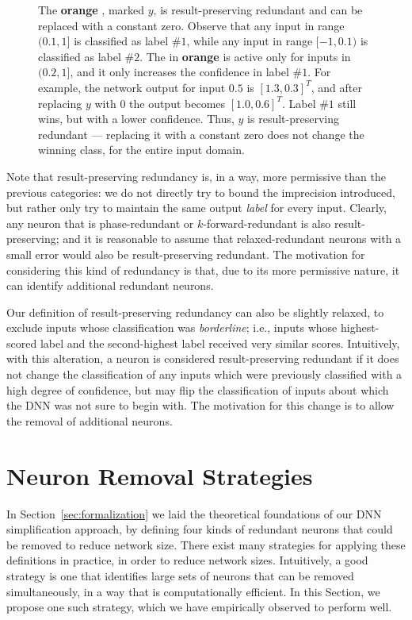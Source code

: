 \documentclass[10pt, conference, twocolumn, compsocconf]{IEEEtran}
\theoremstyle{remark}
\newcommand{\relu}{\text{ReLU}\xspace}
\newcommand{\kfr}{$k$-forward-redundant}
\begin{document}
\begin{figure}[htp]
{
}
\caption {The \textcolor{color1}{\textbf{orange}} \relu{}, marked $y$, is
  result-preserving redundant and can be replaced with a constant zero.
  Observe that any input in range $(0.1, 1]$
  is classified as label $\#1$, while any input in range $[-1, 0.1)$ is
  classified as label $\#2$. The \relu{} in
  \textcolor{color1}{\textbf{orange}} is active only for inputs in
  $(0.2, 1]$, and it only increases the confidence in label $\#1$.
  For example, the network output for input $0.5$ is $[1.3, 0.3]^T$,
  and after replacing $y$ with $0$ the output becomes $[1.0, 0.6]^T$. Label $\#1$ still
  wins, but with a lower confidence.
  Thus, $y$ is result-preserving redundant --- replacing it with a
  constant zero does not change the winning class, for the entire
  input domain.}
\label{fig:respres-example}
\end{figure}

Note that result-preserving redundancy is, in a way, more permissive
than the previous categories: we do not directly try to bound the
imprecision introduced, but rather only try to maintain the same
output \emph{label} for every input.  Clearly, any neuron that is
phase-redundant or \kfr{} is also result-preserving; and it is
reasonable to assume that relaxed-redundant neurons with a small error
would also be result-preserving redundant. The motivation for
considering this kind of redundancy is that, due to its more
permissive nature, it can identify additional redundant neurons.

Our definition of result-preserving
redundancy can also be slightly relaxed, to exclude inputs whose
classification was \emph{borderline}; i.e., inputs whose
highest-scored label and the second-highest label received very
similar scores. Intuitively, with this alteration, a neuron is
considered result-preserving redundant if it does not change the
classification of any inputs which were previously classified with a
high degree of confidence, but may flip the classification of inputs
about which the DNN was not sure to begin with. The motivation for
this change is to allow the removal of additional neurons.

\section{Neuron Removal Strategies}
\label{sec:simultaneousRemoval}
In Section~\ref{sec:formalization} we laid the theoretical foundations
of our DNN simplification approach, by defining four kinds of
redundant neurons that could be removed to reduce network size. There
exist many strategies for applying these definitions in practice, in
order to reduce network sizes.  Intuitively, a good strategy is one
that identifies large sets of neurons that can be removed
simultaneously, in a way that is computationally efficient.  In this
Section, we propose one such strategy, which we have empirically
observed to perform well.
\end{document}
